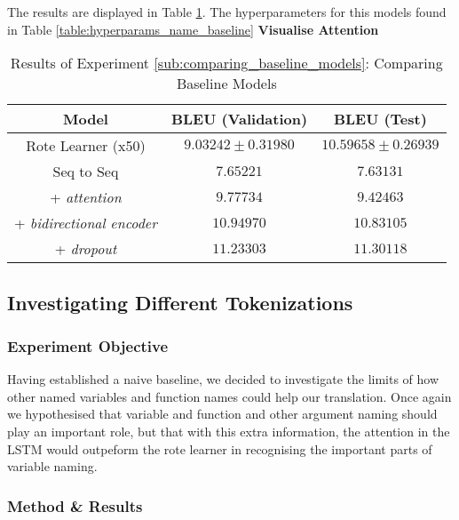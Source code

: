 The results are displayed in Table \ref{table:name_baseline}. The hyperparameters for this models found in Table \ref{table:hyperparams_name_baseline}
\textbf{Visualise Attention}

\begin{table}[h!]
\begin{center}
\begin{tabular}{ c | c | c }
    Model                            & BLEU (Validation)  & BLEU (Test)    \\
    \hline
    Rote Learner (x50)                & $ 9.03242 \pm  0.31980 $ & $ 10.59658 \pm 0.26939 $   \\
    \hline
    Seq to Seq                        & $ 7.65221 $  & $ 7.63131  $ \\
    + \textit{attention}              & $ 9.77734 $  & $ 9.42463  $ \\
    + \textit{bidirectional encoder}  & $ 10.94970 $ & $ 10.83105 $ \\
    + \textit{dropout}                & $ 11.23303 $ & $ 11.30118 $ \\
    \hline
\end{tabular}
\caption {Results of Experiment \ref{sub:comparing_baseline_models}: Comparing Baseline Models }
\label{table:name_baseline}
\end{center}
\end{table}



\subsection{Investigating Different Tokenizations} %
\label{sub:investigating_different_tokenizations}

\subsubsection{Experiment Objective} %

Having established a naive baseline, we decided to investigate the limits of how other named variables and function names could help our translation.
Once again we hypothesised that variable and function and other argument naming should play an important role, but that with this extra information, the attention in the LSTM would outpeform the rote learner in recognising the important parts of variable naming.

\subsubsection{Method \& Results} %





